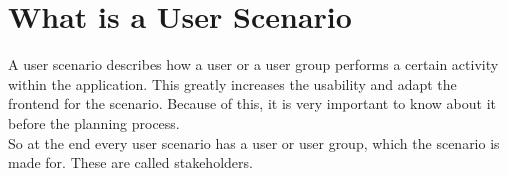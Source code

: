 \section{What is a User Scenario}
A user scenario describes how a user or a user group performs a certain activity within the application. This greatly increases the usability and adapt the frontend for the scenario. Because of this, it is very important to know about it before the planning process.
\\[10pt]
So at the end every user scenario has a user or user group, which the scenario is made for. These are called stakeholders.
